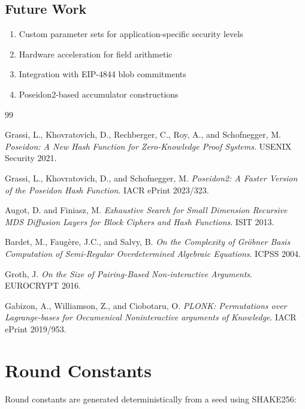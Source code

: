\documentclass[11pt,a4paper]{article}
\begin{document}
\subsection{Future Work}

\begin{enumerate}
    \item Custom parameter sets for application-specific security levels
    \item Hardware acceleration for field arithmetic
    \item Integration with EIP-4844 blob commitments
    \item Poseidon2-based accumulator constructions
\end{enumerate}


\begin{thebibliography}{99}

Grassi, L., Khovratovich, D., Rechberger, C., Roy, A., and Schofnegger, M.
\textit{Poseidon: A New Hash Function for Zero-Knowledge Proof Systems}.
USENIX Security 2021.

Grassi, L., Khovratovich, D., and Schofnegger, M.
\textit{Poseidon2: A Faster Version of the Poseidon Hash Function}.
IACR ePrint 2023/323.

Augot, D. and Finiasz, M.
\textit{Exhaustive Search for Small Dimension Recursive MDS Diffusion Layers for Block Ciphers and Hash Functions}.
ISIT 2013.

Bardet, M., Faugère, J.C., and Salvy, B.
\textit{On the Complexity of Gröbner Basis Computation of Semi-Regular Overdetermined Algebraic Equations}.
ICPSS 2004.

Groth, J.
\textit{On the Size of Pairing-Based Non-interactive Arguments}.
EUROCRYPT 2016.

Gabizon, A., Williamson, Z., and Ciobotaru, O.
\textit{PLONK: Permutations over Lagrange-bases for Oecumenical Noninteractive arguments of Knowledge}.
IACR ePrint 2019/953.

\end{thebibliography}

\appendix

\section{Round Constants}

Round constants are generated deterministically from a seed using SHAKE256:
\end{document}
